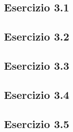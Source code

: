 \subsection{\textbf{Esercizio 3.1}}

\subsection{\textbf{Esercizio 3.2}}

\subsection{\textbf{Esercizio 3.3}}

\subsection{\textbf{Esercizio 3.4}}

\subsection{\textbf{Esercizio 3.5}}
